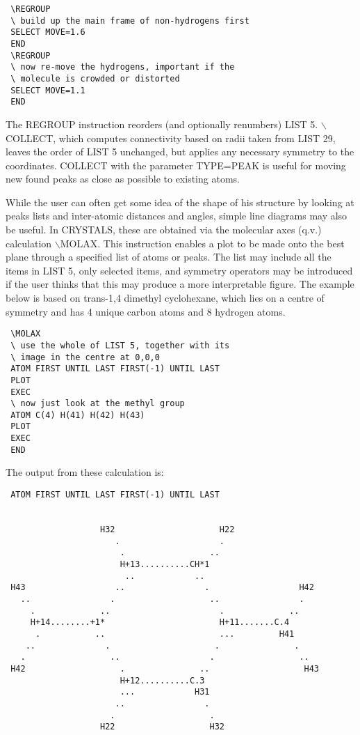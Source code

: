 \documentclass[10pt,a4paper]{report}
\begin{document}
\small\begin{verbatim}
 \REGROUP
 \ build up the main frame of non-hydrogens first
 SELECT MOVE=1.6
 END
 \REGROUP
 \ now re-move the hydrogens, important if the 
 \ molecule is crowded or distorted
 SELECT MOVE=1.1
 END
\end{verbatim}\normalsize




The REGROUP instruction reorders (and optionally renumbers) LIST 5.
 $\backslash$COLLECT, which computes connectivity based on radii taken from LIST 29,
 leaves the order of LIST 5 unchanged, but applies any necessary symmetry
 to the coordinates. COLLECT with the parameter TYPE=PEAK is useful for
 moving new found peaks as close as possible to existing atoms.


While the user can often get some idea of the shape of his structure by
 looking at peaks lists and inter-atomic distances and angles, simple line
 diagrams may also be useful. In CRYSTALS, these are obtained via the
 molecular axes (q.v.) calculation $\backslash$MOLAX. This instruction enables a
 plot
 to be made onto the best plane through a specified list of atoms or peaks.
 The list may include all the items in LIST 5, only selected items, and
 symmetry operators may be introduced if the user thinks that this may
 produce a more interpretable figure. The example below is based on trans-1,4 
 dimethyl cyclohexane, which lies on a centre of symmetry and
 has 4 unique carbon atoms and 8 hydrogen atoms. 

\small\begin{verbatim}
 \MOLAX
 \ use the whole of LIST 5, together with its 
 \ image in the centre at 0,0,0
 ATOM FIRST UNTIL LAST FIRST(-1) UNTIL LAST
 PLOT
 EXEC
 \ now just look at the methyl group
 ATOM C(4) H(41) H(42) H(43)
 PLOT
 EXEC
 END
\end{verbatim}\normalsize






 The output from these calculation is:
 
\small\begin{verbatim} ATOM FIRST UNTIL LAST FIRST(-1) UNTIL LAST
 
 
                   H32                     H22
                      .                    .
                       .                 ..
                       H+13..........CH*1
                        ..            ..
 H43                  ..                .                  H42
   ..                .                   ..                .
     .             ..                      .             ..
     H+14........+1*                       H+11.......C.4
      .           ..                       ...         H41
    ..              .                     .               .
   .                 ..                  .                 ..
 H42                   .               ..                   H43
                       H+12..........C.3
                       ...            H31
                      ..                .
                     .                   .
                   H22                   H32
 \end{verbatim}\normalsize
\end{document}
